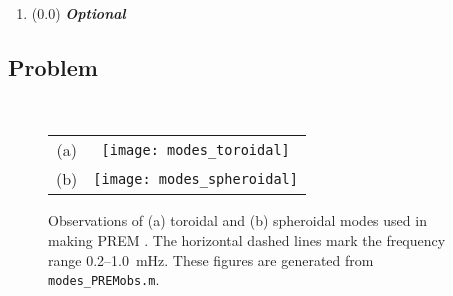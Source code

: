 \documentclass[11pt,titlepage,fleqn]{article}
\begin{document}
\begin{enumerate}

\pagebreak
\item (0.0) {\bf\em Optional} 

\end{enumerate}


\subsection*{Problem} \howmuchtime\




\clearpage\pagebreak


\begin{figure}
\centering
\begin{tabular}{cc}
(a) & \texttt{[image: modes\_toroidal]} \\
(b) & \texttt{[image: modes\_spheroidal]}
\end{tabular}
\caption[]
{{
Observations of (a) toroidal and (b) spheroidal modes used in making PREM \citep{PREM}.
The horizontal dashed lines mark the frequency range 0.2--1.0~mHz.
These figures are generated from {\tt modes\_PREMobs.m}.
}}
\label{fig:premmodes}
\end{figure}


\clearpage\pagebreak



\end{document}
